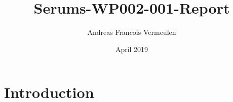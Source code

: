 \documentclass{article}
\title{Serums-WP002-001-Report}
\author{Andreas Francois Vermeulen}
\date{April 2019}
\begin{document}
\maketitle

\section{Introduction}
\end{document}
